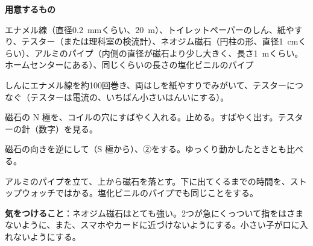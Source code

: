 \begin{yattemiyou}[磁石とコイルで電流を起こそう]
\textbf{用意するもの}\par
エナメル線（直径\qty{0.2}{mm}くらい、\qty{20}{m}）、トイレットペーパーのしん、紙やすり、テスター（または理科室の検流計）、ネオジム磁石（円柱の形、直径\qty{1}{cm}くらい）、アルミのパイプ（内側の直径が磁石より少し大きく、長さ\qty{1}{m}くらい。ホームセンターにある）、同じくらいの長さの塩化ビニルのパイプ\par\vspace{2pt}
\noindent\begin{minipage}[c]{0.64\linewidth}
\begin{enumerate}[label={\bkcircled[bkGreen]{\arabic*}}, leftmargin=2.4\zw, itemsep=1pt, topsep=0pt]
\item しんにエナメル線を約100回巻き、両はしを紙やすりでみがいて、テスターにつなぐ（テスターは電流の、いちばん小さいはんいにする）。
\item 磁石の N 極を、コイルの穴にすばやく入れる。止める。すばやく出す。テスターの針（数字）を見る。
\item 磁石の向きを逆にして（S 極から）、②をする。ゆっくり動かしたときとも比べる。
\item アルミのパイプを立て、上から磁石を落とす。下に出てくるまでの時間を、ストップウォッチではかる。塩化ビニルのパイプでも同じことをする。
\end{enumerate}
\end{minipage}\hfill
\begin{minipage}[c]{0.33\linewidth}\centering
{}
\end{minipage}
\par\vspace{2pt}\textbf{気をつけること}：ネオジム磁石はとても強い。2つが急にくっついて指をはさまないように、また、スマホやカードに近づけないようにする。小さい子が口に入れないようにする。
\end{yattemiyou}

